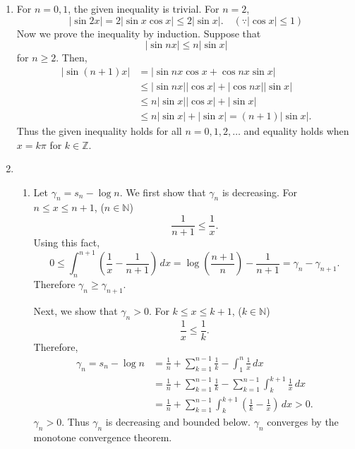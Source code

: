 \documentclass[12pt]{report}
\newcommand{\numl}[1]{\item[\large\textbf{\sffamily #1.}]}
\newcommand{\num}[1]{\item[\textbf{\sffamily #1}]}
\newcommand{\abs}[1]{\left| #1 \right|}
\newcommand{\N}{\mathbb{N}}
\newcommand{\Z}{\mathbb{Z}}
\renewcommand{\d}[1]{\,d{#1}}
\begin{document}
\begin{enumerate}
    \numl{6} For \(n = 0, 1\), the given inequality is trivial. For \(n = 2\),
    \[
        \abs{\sin 2x} = 2\abs{\sin x \cos x} \leq 2\abs{\sin x}. \quad (\because \abs{\cos x} \leq 1)
    \]
    Now we prove the inequality by induction. Suppose that
    \[
        \abs{\sin nx} \leq n\abs{\sin x}
    \]
    for \(n \geq 2\). Then,
    \[
        \begin{aligned}
            \abs{\sin (n+1)x} & = \abs{\sin nx \cos x + \cos nx \sin x}                      \\
                              & \leq \abs{\sin nx} \abs{\cos x} + \abs{\cos nx} \abs{\sin x} \\
                              & \leq n \abs{\sin x}\abs{\cos x} + \abs{\sin x}               \\
                              & \leq n \abs{\sin x} + \abs{\sin x} = (n+1)\abs{\sin x}.
        \end{aligned}
    \]
    Thus the given inequality holds for all \(n = 0, 1, 2, \dots\) and equality holds when \(x = k \pi\) for \(k \in \Z\).

    \numl{7}
    \begin{enumerate}
        \num{(a)} Let \(\gamma_n = s_n - \log n\). We first show that \(\gamma_n\) is decreasing. For \(n \leq x \leq n+1\), (\(n \in \N\))
        \[
            \frac{1}{n+1} \leq \frac{1}{x}.
        \]
        Using this fact,
        \[
            0 \leq \int_n^{n+1} \left(\frac{1}{x} - \frac{1}{n+1}\right) \d{x} = \log\left(\frac{n+1}{n}\right) - \frac{1}{n+1} = \gamma_n - \gamma_{n+1}.
        \]
        Therefore \(\gamma_n \geq \gamma_{n+1}\).

        Next, we show that \(\gamma_n > 0\). For \(k \leq x \leq k + 1\), (\(k \in \N\))
        \[
            \frac{1}{x} \leq \frac{1}{k}.
        \]
        Therefore,
        \[
            \begin{aligned}
                \gamma_n = s_n - \log n & = \frac{1}{n} + \sum_{k=1}^{n-1} \frac{1}{k} - \int_1^n \frac{1}{x}\d{x}                        \\
                                        & = \frac{1}{n} + \sum_{k=1}^{n-1} \frac{1}{k} - \sum_{k=1}^{n-1} \int_k^{k+1} \frac{1}{x}\d{x}   \\
                                        & = \frac{1}{n} + \sum_{k=1}^{n-1} \int_k^{k+1} \left(\frac{1}{k} - \frac{1}{x}\right) \d{x} > 0.
            \end{aligned}
        \]
        \(\gamma_n > 0\). Thus \(\gamma_n\) is decreasing and bounded below. \(\gamma_n\) converges by the monotone convergence theorem.


\end{enumerate}
\end{enumerate}
\end{document}
